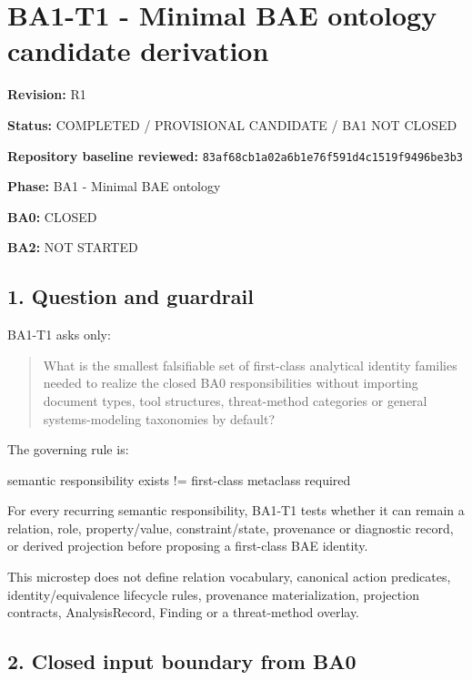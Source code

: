 \documentclass[
]{article}
\author{}
\date{}
\newenvironment{Shaded}{}{}
\newcommand{\NormalTok}[1]{#1}
\begin{document}
\section{BA1-T1 - Minimal BAE ontology candidate
derivation}\label{ba1-t1---minimal-bae-ontology-candidate-derivation}

\textbf{Revision:} R1

\textbf{Status:} COMPLETED / PROVISIONAL CANDIDATE / BA1 NOT CLOSED

\textbf{Repository baseline reviewed:}
\texttt{83af68cb1a02a6b1e76f591d4c1519f9496be3b3}

\textbf{Phase:} BA1 - Minimal BAE ontology

\textbf{BA0:} CLOSED

\textbf{BA2:} NOT STARTED

\subsection{1. Question and guardrail}\label{1-question-and-guardrail}

BA1-T1 asks only:

\begin{quote}
What is the smallest falsifiable set of first-class analytical identity
families needed to realize the closed BA0 responsibilities without
importing document types, tool structures, threat-method categories or
general systems-modeling taxonomies by default?
\end{quote}

The governing rule is:

\begin{Shaded}
\begin{Highlighting}[]
\NormalTok{semantic responsibility exists}
\NormalTok{        !=}
\NormalTok{first{-}class metaclass required}
\end{Highlighting}
\end{Shaded}

For every recurring semantic responsibility, BA1-T1 tests whether it can
remain a relation, role, property/value, constraint/state, provenance or
diagnostic record, or derived projection before proposing a first-class
BAE identity.

This microstep does not define relation vocabulary, canonical action
predicates, identity/equivalence lifecycle rules, provenance
materialization, projection contracts, AnalysisRecord, Finding or a
threat-method overlay.

\subsection{2. Closed input boundary from
BA0}\label{2-closed-input-boundary-from-ba0}
\end{document}
